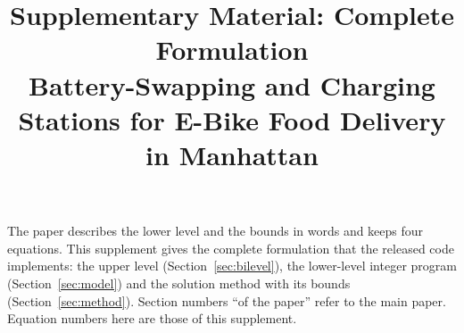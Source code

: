 \documentclass[11pt]{article}
\title{Supplementary Material: Complete Formulation\\[2pt]\large Battery-Swapping and Charging Stations for E-Bike Food Delivery in Manhattan}
\author{}
\date{}
\begin{document}
\maketitle
\noindent The paper describes the lower level and the bounds in words and keeps four equations. This supplement gives the complete formulation that the released code implements: the upper level (Section~\ref{sec:bilevel}), the lower-level integer program (Section~\ref{sec:model}) and the solution method with its bounds (Section~\ref{sec:method}). Section numbers ``of the paper'' refer to the main paper. Equation numbers here are those of this supplement.
\setcounter{section}{1}



\end{document}
